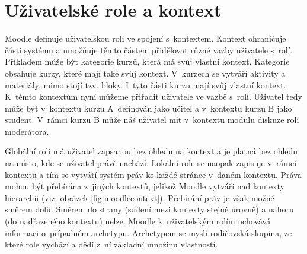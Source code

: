 \documentclass[
print,
  11pt,
  table,   
  nolof,    
  nolot,
  oneside,
  draft
]{fithesis3}
\begin{document}
	\section{Uživatelské role a kontext}
Moodle definuje uživatelskou roli ve spojení s~kontextem. Kontext ohraničuje části systému a umožňuje těmto částem přidělovat různé vazby uživatele s~rolí. Příkladem může být kategorie kurzů, která má svůj vlastní kontext. Kategorie obsahuje kurzy, které mají také svůj kontext. V~kurzech se vytváří aktivity a materiály, mimo stojí tzv. bloky. I~tyto části kurzu mají svůj vlastní kontext. K~těmto kontextům nyní můžeme přiřadit uživatele ve vazbě s~rolí. Uživatel tedy může být v~kontextu kurzu A~definován jako učitel a v~kontextu kurzu B jako student. V~rámci kurzu B může náš uživatel mít v~kontextu modulu diskuze roli moderátora. 

Globální roli má uživatel zapsanou bez ohledu na kontext a je platná bez ohledu na místo, kde se uživatel právě nachází. Lokální role se naopak zapisuje v~rámci kontextu a tím se vytváří systém práv ke každé stránce v~daném kontextu. Práva mohou být přebírána z~jiných kontextů, jelikož Moodle vytváří nad kontexty hierarchii (viz. obrázek \ref{fig:moodlecontext}). Přebírání práv je však možné směrem dolů. Směrem do strany (sdílení mezi kontexty stejné úrovně) a nahoru (do nadřazeného kontextu) nelze. Moodle k~uživatelským rolím uchovává informaci o~případném archetypu. Archetypem se myslí rodičovská skupina, ze které role vychází a dědí z~ní základní množinu vlastností. 
 
\end{document}
